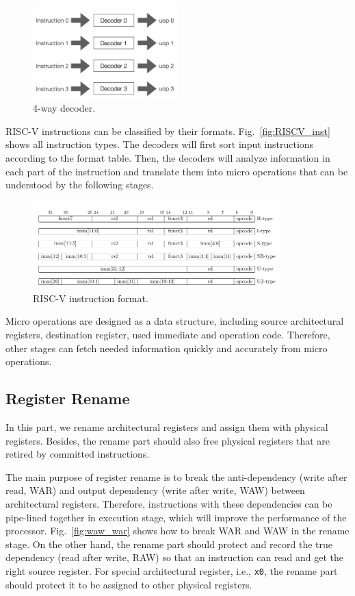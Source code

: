 \begin{figure}[!htp]
    \centering
    \includegraphics[width=0.5\textwidth]{figure/decode.png}
    \caption{4-way decoder.}
    \label{fig:decoder}
\end{figure}

RISC-V instructions can be classified by their formats. Fig.~\ref{fig:RISCV_inst} shows all instruction types. The decoders will first sort input instructions according to the format table. Then, the decoders will analyze information in each part of the instruction and translate them into micro operations that can be understood by the following stages.

\begin{figure}[!htp]
    \centering
    \includegraphics[width=0.85\textwidth]{figure/riscv-isa.png}
    \caption{RISC-V instruction format\cite{RISC-V_unprivileged_ISA}.}
    \label{fig:RISCV_inst1}
\end{figure}

Micro operations are designed as a data structure, including source architectural registers, destination register, used immediate and operation code. Therefore, other stages can fetch needed information quickly and accurately from micro operations.

\subsection{Register Rename} %
In this part, we rename architectural registers and assign them with physical registers. Besides, the rename part should also free physical registers that are retired by committed instructions.

The main purpose of register rename is to break the anti-dependency (write after read, WAR) and output dependency (write after write, WAW) between architectural registers. Therefore, instructions with these dependencies can be pipe-lined together in execution stage, which will improve the performance of the processor. Fig.~\ref{fig:waw_war} shows how to break WAR and WAW in the rename stage. On the other hand, the rename part should protect and record the true dependency (read after write, RAW) so that an instruction can read and get the right source register. For special architectural register, i.e., \texttt{x0}, the rename part should protect it to be assigned to other physical registers.

